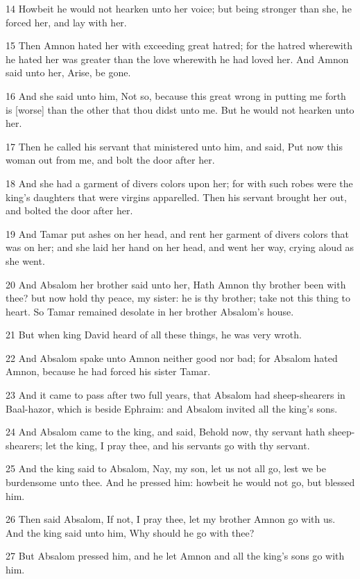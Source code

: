 \par 14 Howbeit he would not hearken unto her voice; but being stronger than she, he forced her, and lay with her.
\par 15 Then Amnon hated her with exceeding great hatred; for the hatred wherewith he hated her was greater than the love wherewith he had loved her. And Amnon said unto her, Arise, be gone.
\par 16 And she said unto him, Not so, because this great wrong in putting me forth is [worse] than the other that thou didst unto me. But he would not hearken unto her.
\par 17 Then he called his servant that ministered unto him, and said, Put now this woman out from me, and bolt the door after her.
\par 18 And she had a garment of divers colors upon her; for with such robes were the king's daughters that were virgins apparelled. Then his servant brought her out, and bolted the door after her.
\par 19 And Tamar put ashes on her head, and rent her garment of divers colors that was on her; and she laid her hand on her head, and went her way, crying aloud as she went.
\par 20 And Absalom her brother said unto her, Hath Amnon thy brother been with thee? but now hold thy peace, my sister: he is thy brother; take not this thing to heart. So Tamar remained desolate in her brother Absalom's house.
\par 21 But when king David heard of all these things, he was very wroth.
\par 22 And Absalom spake unto Amnon neither good nor bad; for Absalom hated Amnon, because he had forced his sister Tamar.
\par 23 And it came to pass after two full years, that Absalom had sheep-shearers in Baal-hazor, which is beside Ephraim: and Absalom invited all the king's sons.
\par 24 And Absalom came to the king, and said, Behold now, thy servant hath sheep-shearers; let the king, I pray thee, and his servants go with thy servant.
\par 25 And the king said to Absalom, Nay, my son, let us not all go, lest we be burdensome unto thee. And he pressed him: howbeit he would not go, but blessed him.
\par 26 Then said Absalom, If not, I pray thee, let my brother Amnon go with us. And the king said unto him, Why should he go with thee?
\par 27 But Absalom pressed him, and he let Amnon and all the king's sons go with him.
